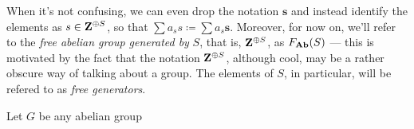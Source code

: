 \begin{notation}
When it's not confusing, we can even drop the notation \(\mathbf{s}\) and
instead identify the elements as \(s \in \mathbf{Z}^{\oplus S}\), so that
\(\sum a_s s \coloneq \sum a_s \mathbf{s}\). Moreover, for now on, we'll refer
to the \emph{free abelian group generated by} \(S\), that is, \(\mathbf{Z}^{\oplus S}\),
as \(F_{{\textbf{Ab}}}(S)\) --- this is motivated by the fact that the notation
\(\mathbf{Z}^{\oplus S}\), although cool, may be a rather obscure way of talking about a
group. The elements of \(S\), in particular, will be refered to as \emph{free
  generators}.
\end{notation}

\begin{proposition}
\label{prop:Ab-isomorphic-factor-of-free}
Let \(G\) be any abelian group
\end{proposition}


